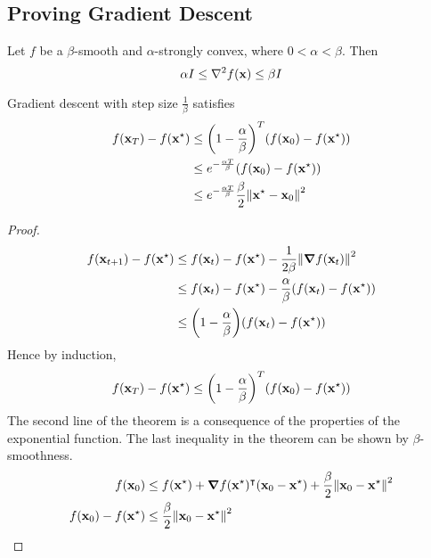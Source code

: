 \subsection{Proving Gradient Descent}
Let \(f\) be a \(\beta\)-smooth and \(\alpha\)-strongly convex, where \(0 < \alpha < \beta\).
Then
\[
	\alpha I \leq \laplacian{f(\vb x)} \leq \beta I
\]
\begin{theorem}
	Gradient descent with step size \(\frac{1}{\beta}\) satisfies
	\begin{align*}
		f(\vb x_T) - f(\vb x^\star) & \leq \qty(1 - \frac{\alpha}{\beta})^T \qty(f(\vb x_0) - f(\vb x^\star)) \\&\leq e^{-\frac{\alpha T}{\beta}} \qty(f(\vb x_0) - f(\vb x^\star)) \\&\leq e^{-\frac{\alpha T}{\beta}} \frac{\beta}{2} \norm{\vb x^\star - \vb x_0}^2
	\end{align*}
\end{theorem}

\begin{proof}
	\begin{align*}
		f(\vb x_{t+1}) - f(\vb x^\star) & \leq f(\vb x_t) - f(\vb x^\star) - \frac{1}{2\beta} \norm{\grad{f(\vb x_t)}}^2            \\
		                                & \leq f(\vb x_t) - f(\vb x^\star) - \frac{\alpha}{\beta} \qty(f(\vb x_t) - f(\vb x^\star)) \\
		                                & \leq \qty(1 - \frac{\alpha}{\beta}) \qty(f(\vb x_t) - f(\vb x^\star))
	\end{align*}
	Hence by induction,
	\[
		f(\vb x_T) - f(\vb x^\star) \leq \qty(1 - \frac{\alpha}{\beta})^T \qty(f(\vb x_0) - f(\vb x^\star))
	\]
	The second line of the theorem is a consequence of the properties of the exponential function.
	The last inequality in the theorem can be shown by \(\beta\)-smoothness.
	\begin{align*}
		f(\vb x_0)                  & \leq f(\vb x^\star) + \grad{f(\vb x^\star)}^\intercal (\vb x_0 - \vb x^\star) + \frac{\beta}{2}\norm{\vb x_0 - \vb x^\star}^2 \\
		f(\vb x_0) - f(\vb x^\star) & \leq \frac{\beta}{2}\norm{\vb x_0 - \vb x^\star}^2                                                                             \\
	\end{align*}
\end{proof}

